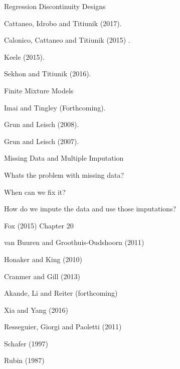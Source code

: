 \documentclass[letterpaper]{article}
\renewenvironment{itemize}{
  \begin{list}{}{
    \setlength{\leftmargin}{1.5em}
  }
}{
  \end{list}
}
\begin{document}
\begin{enumerate}
	\item Regression Discontinuity Designs

			\begin{itemize}
				\item[$\star$] Cattaneo, Idrobo and Titiunik (2017).
				\item[$\star$] Calonico, Cattaneo and Titiunik (2015) .
				\item[$\star$] Keele (2015).
				\item[$\star$] Sekhon and Titiunik (2016).
			\end{itemize}



	\item Finite Mixture Models


			\begin{itemize}
				\item[$\star$] Imai and Tingley (Forthcoming).
				\item[$\star$] Grun and Leisch (2008).
				\item[$\star$] Grun and Leisch (2007).
			\end{itemize}

	\item Missing Data and Multiple Imputation 

			\begin{itemize}
				\item[$\square$] Whats the problem with missing data? 
				\item[$\square$] When can we fix it?
				\item[$\square$] How do we impute the data and use those imputations?
			\end{itemize}



			\begin{itemize}
				\item[$\star$] Fox (2015) Chapter 20
				\item[$\star$] van Buuren and Groothuis-Oudshoorn (2011) 
				\item[$\star$] Honaker and King (2010) 
				\item[$\star$] Cranmer and Gill (2013)
				\item[$\star$] Akande, Li and Reiter (forthcoming)
				\item[$\star$] Xia and Yang (2016)
				\item[$\star$] Resseguier, Giorgi and Paoletti (2011)
				\item[-] Schafer (1997)
				\item[-] Rubin (1987)
			\end{itemize}


\end{enumerate}
\end{document}

